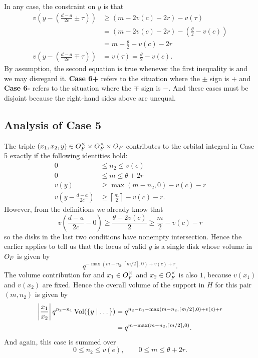 \begin{description}
  In any case, the constraint on $y$ is that
  \begin{align*}
    v\left( y - \left( \frac{d-a}{2c} \pm \tau \right) \right)
      &\ge \left( m - 2v(c) - 2r \right) - v(\tau) \\
      &= \left( m - 2v(c) - 2r \right) - \left( \frac{\theta}{2} - v(c) \right) \\
      &= m - \frac{\theta}{2} - v(c) - 2r \\
    v\left( y - \left( \frac{d-a}{2c} \mp \tau \right) \right) &= v(\tau)
      = \frac{\theta}{2} - v(c).
  \end{align*}
  By assumption, the second equation is true
  whenever the first inequality is and we may disregard it.
  \textbf{Case 6\ts+} refers to the situation where the $\pm$ sign is $+$
  and \textbf{Case 6\ts-} refers to the situation where the $\mp$ sign is $-$.
  And these cases must be disjoint because the right-hand sides above are unequal.
\end{description}

\subsection{Analysis of Case 5}
The triple $(x_1, x_2, y) \in O_F^\times \times O_F^\times \times O_F$
contributes to the orbital integral in Case 5 exactly if the following identities hold:
\begin{align*}
  0 &\le n_2 \le v(e) \\
  0 &\le m \le \theta + 2r \\
  v(y) &\ge \max(m-n_2,0) - v(c) - r \\
  v\left( y - \frac{d-a}{2c} \right) &\ge \left\lceil \frac{m}{2} \right\rceil - v(c) - r.
\end{align*}
However, from the definitions we already know that
\[ v\left( \frac{d-a}{2c} - 0 \right)
  \ge \frac{\theta - 2v(c)}{2} \ge \frac{m}{2} - v(c) - r \]
so the disks in the last two conditions have nonempty intersection.
Hence the earlier  applies to tell us that
the locus of valid $y$ is a single disk whose volume in $O_F$ is given by
\[ q^{-\max\left( m-n_2, \left\lceil m/2 \right\rceil, 0 \right) + v(c) + r}. \]
The volume contribution for and $x_1 \in O_F^\times$ and $x_2 \in O_F^\times$
is also $1$, because $v(x_1)$ and $v(x_2)$ are fixed.
Hence the overall volume of the support in $H$ for this pair $(m, n_2)$ is given by
\begin{align*}
  \left\lvert \frac{x_1}{x_2} \right\rvert q^{n_2 - n_1} \operatorname{Vol}(\{ y \mid \dots \})
  &= q^{n_2 - n_1 -\max\left( m-n_2, \left\lceil m/2 \right\rceil, 0 \right) + v(c) + r} \\
  &= q^{m - \max\left( m-n_2, \left\lceil m/2 \right\rceil, 0 \right)}.
\end{align*}
And again, this case is summed over
\[ 0 \le n_2 \le v(e), \qquad 0 \le m \le \theta + 2r. \]

